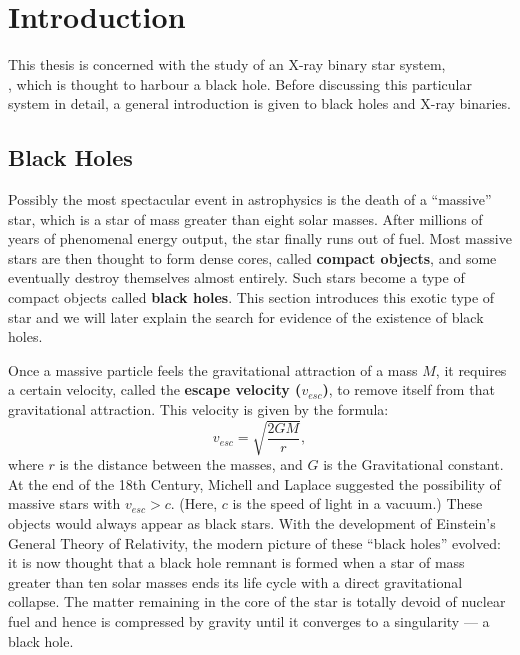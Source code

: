 
\chapter{Introduction}\label{cha:Introduction}

This thesis is concerned with the study of an X-ray binary star
system,\\%
\groj, which is thought to harbour a black hole. Before
discussing this particular system in detail, a general introduction is
given to black holes and X-ray binaries. %


\section{Black Holes}\label{cha:Introduction:sec:BlackHoles}

Possibly the most spectacular event in astrophysics is the death of a
``massive'' star, which is a star of mass greater than eight solar
masses. After millions of years of phenomenal energy output, the star
finally runs out of fuel. Most massive stars are then thought to form
dense cores, called \textbf{compact objects}, and some eventually
destroy themselves almost entirely. Such stars become a type of
compact objects called \textbf{black holes}. This section introduces
this exotic type of star and we will later explain the search for
evidence of the existence of black holes. %

\vspace{\myparskip}

Once a massive particle feels the gravitational attraction of a mass $M$, it
requires a certain velocity, called the \textbf{escape velocity
($v_{esc}$)}, to remove itself from that gravitational attraction. This
velocity is given by the formula:
\begin{equation} \label{cha:Introduction:sec:BlackHoles:eqn:V_Esc}
v_{esc} = \sqrt{\frac{2 G M}{r}},
\end{equation}
where $r$ is the distance between the masses, and $G$ is the
Gravitational constant. At the end of the 18th Century, Michell and Laplace suggested the
possibility of massive stars with $v_{esc} > c$. (Here, $c$ is the
speed of light in a vacuum.) These objects would always appear as
black stars. With the development of Einstein's General Theory of
Relativity, the modern picture of these ``black holes'' evolved: it is
now thought that a black hole remnant is formed when a star of
mass greater than ten solar masses ends its life cycle with a direct gravitational collapse. %
The matter remaining in the core of the star is totally devoid of
nuclear fuel and hence is compressed by gravity until it converges to a singularity --- a black hole. %

